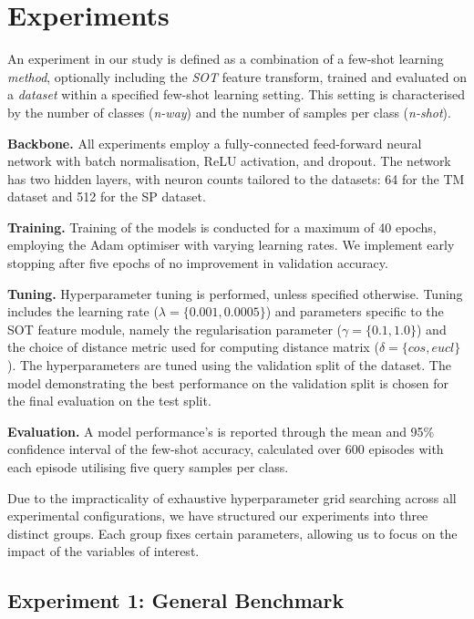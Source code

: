 \section{Experiments}

An experiment in our study is defined as a combination of a few-shot learning \textit{method}, optionally including the \textit{SOT} feature transform, trained and evaluated on a \textit{dataset} within a specified few-shot learning setting. This setting is characterised by the number of classes (\textit{n-way}) and the number of samples per class (\textit{n-shot}).

\textbf{Backbone.} All experiments employ a fully-connected feed-forward neural network with batch normalisation, ReLU activation, and dropout. The network has two hidden layers, with neuron counts tailored to the datasets: 64 for the TM dataset and 512 for the SP dataset.

\textbf{Training.} Training of the models is conducted for a maximum of 40 epochs, employing the Adam optimiser with varying learning rates. We implement early stopping after five epochs of no improvement in validation accuracy. 

\textbf{Tuning.} Hyperparameter tuning is performed, unless specified otherwise. Tuning includes the learning rate ($\lambda = \{0.001, 0.0005\}$) and parameters specific to the SOT feature module, namely the regularisation parameter ($\gamma = \{0.1, 1.0\}$) and the choice of distance metric used for computing distance matrix ($\delta = \{cos, eucl\}$). The hyperparameters are tuned using the validation split of the dataset. The model demonstrating the best performance on the validation split is chosen for the final evaluation on the test split.



\textbf{Evaluation.} A model performance's is reported through the mean and 95\% confidence interval of the few-shot accuracy, calculated over 600 episodes with each episode utilising five query samples per class.

Due to the impracticality of exhaustive hyperparameter grid searching across all experimental configurations, we have structured our experiments into three distinct groups. Each group fixes certain parameters, allowing us to focus on the impact of the variables of interest.

\subsection{Experiment 1: General Benchmark}

